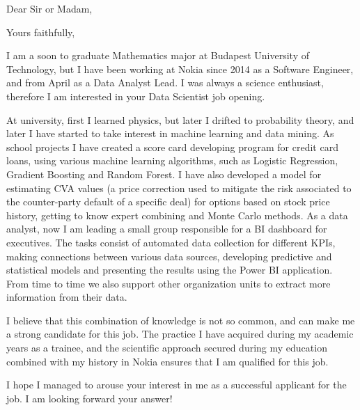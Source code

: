 \documentclass[11pt,a4paper,sans,english]{moderncv}        %
\begin{document}
\clearpage
\date{\today}%
\opening{Dear Sir or Madam,}%
\closing{Yours faithfully,}%
\makelettertitle
I am a soon to graduate Mathematics major at Budapest University of Technology, but I have been working at Nokia since 2014 as a Software Engineer, and from April as a Data Analyst Lead. I was always a science enthusiast, therefore I am interested in your Data Scientist job opening.

At university, first I learned physics, but later I drifted to probability theory, and later I have started to take interest in machine learning and data mining. As school projects I have created a score card developing program for credit card loans, using various machine learning algorithms, such as Logistic Regression, Gradient Boosting and Random Forest. I have also developed a model for estimating CVA values (a price correction used to mitigate the risk associated to the counter-party default of a specific deal) for options based on stock price history, getting to know expert combining and Monte Carlo methods. As a data analyst, now I am leading a small group responsible for a BI dashboard for executives. The tasks consist of automated data collection for different KPIs, making connections between various data sources, developing predictive and statistical models and presenting the results using the Power BI application. From time to time we also support other organization units to extract more information from their data.

I believe that this combination of knowledge is not so common, and can make me a strong candidate for this job. The practice I have acquired during my academic years as a trainee, and the scientific approach secured during my education combined with my history in Nokia ensures that I am qualified for this job.

I hope I managed to arouse your interest in me as a successful applicant for the job. I am looking forward your answer!

\makeletterclosing
\end{document}
